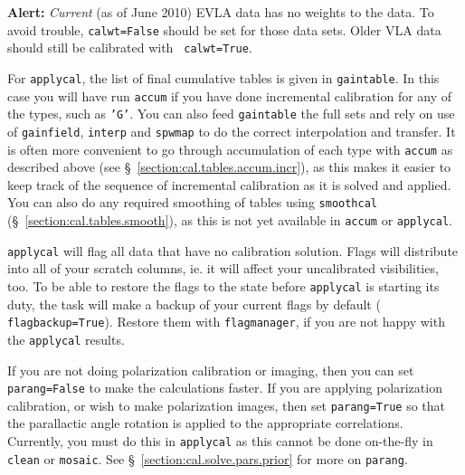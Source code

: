 {\bf Alert:} {\it Current} (as of June 2010) EVLA data has no weights
to the data. To avoid trouble, {\tt calwt=False} should be set for
those data sets. Older VLA data should still be calibrated with {\tt
  calwt=True}.

For {\tt applycal}, the list of final cumulative tables is given in 
{\tt gaintable}.  In this case you will have run {\tt accum} if you
have done incremental calibration for any of the types, such as {\tt 'G'}. 
You can also feed {\tt gaintable} the full sets and rely on use of
{\tt gainfield}, {\tt interp} and {\tt spwmap} to do the correct 
interpolation and transfer.  It is often more convenient to go through
accumulation of each type with {\tt accum} as described above
(see \S~\ref{section:cal.tables.accum.incr}), as this makes it easier
to keep track of the sequence of incremental calibration as it is
solved and applied.  You can also do any required smoothing of tables
using {\tt smoothcal} (\S~\ref{section:cal.tables.smooth}), as this
is not yet available in {\tt accum} or {\tt applycal}.


{\tt applycal} will flag all data that have no calibration
solution. Flags will distribute into all of your scratch columns,
ie. it will affect your uncalibrated visibilities, too. To be able to
restore the flags to the state before {\tt applycal} is starting its
duty, the task will make a backup of your current flags by default ({\tt
  flagbackup=True}). Restore them with {\tt flagmanager}, if you are
not happy with the {\tt applycal} results.



If you are not doing polarization calibration or imaging, then you can set 
{\tt parang=False} to make the calculations faster.  If you are
applying polarization calibration, or wish to make polarization
images, then set {\tt parang=True} so that the parallactic angle
rotation is applied to the appropriate correlations.  Currently,
you must do this in {\tt applycal} as this cannot be done on-the-fly
in {\tt clean} or {\tt mosaic}.  
See \S~\ref{section:cal.solve.pars.prior} for more on {\tt parang}.


